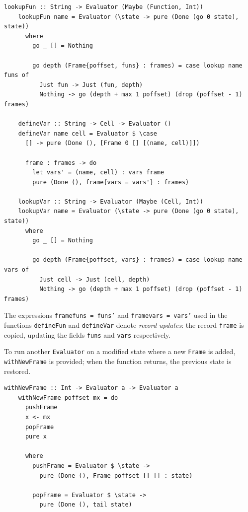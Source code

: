 \documentclass[UdineBachThesis,american,11pt]{PhdThesis}
\begin{document}
  \begin{Verbatim}[gobble=4,fontsize=\small]
    lookupFun :: String -> Evaluator (Maybe (Function, Int))
    lookupFun name = Evaluator (\state -> pure (Done (go 0 state), state))
      where
        go _ [] = Nothing

        go depth (Frame{poffset, funs} : frames) = case lookup name funs of
          Just fun -> Just (fun, depth)
          Nothing -> go (depth + max 1 poffset) (drop (poffset - 1) frames)

    defineVar :: String -> Cell -> Evaluator ()
    defineVar name cell = Evaluator $ \case
      [] -> pure (Done (), [Frame 0 [] [(name, cell)]])

      frame : frames -> do
        let vars' = (name, cell) : vars frame
        pure (Done (), frame{vars = vars'} : frames)

    lookupVar :: String -> Evaluator (Maybe (Cell, Int))
    lookupVar name = Evaluator (\state -> pure (Done (go 0 state), state))
      where
        go _ [] = Nothing

        go depth (Frame{poffset, vars} : frames) = case lookup name vars of
          Just cell -> Just (cell, depth)
          Nothing -> go (depth + max 1 poffset) (drop (poffset - 1) frames)
  \end{Verbatim}

  The expressions \mbox{\texttt{frame{funs = funs'}}} and
  \mbox{\texttt{frame{vars = vars'}}} used in the functions
  \mbox{\texttt{defineFun}} and \mbox{\texttt{defineVar}} denote \emph{record
  updates}: the record \mbox{\texttt{frame}} is copied, updating the fields
  \mbox{\texttt{funs}} and \mbox{\texttt{vars}} respectively.

  To run another \mbox{\texttt{Evaluator}} on a modified state where a new
  \mbox{\texttt{Frame}} is added, \mbox{\texttt{withNewFrame}} is provided; when
  the function returns, the previous state is restored.

  \begin{Verbatim}[gobble=4,fontsize=\small]
    withNewFrame :: Int -> Evaluator a -> Evaluator a
    withNewFrame poffset mx = do
      pushFrame
      x <- mx
      popFrame
      pure x

      where
        pushFrame = Evaluator $ \state ->
          pure (Done (), Frame poffset [] [] : state)

        popFrame = Evaluator $ \state ->
          pure (Done (), tail state)
  \end{Verbatim}
\end{document}
